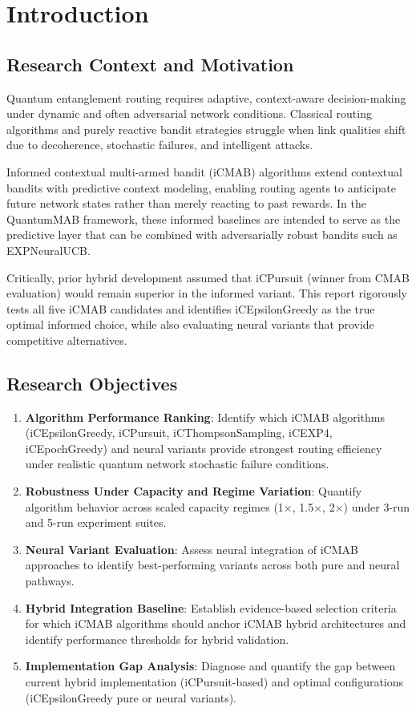 \documentclass[12pt,a4paper]{article}
\begin{document}
\newpage
\section{Introduction}

\subsection{Research Context and Motivation}
Quantum entanglement routing requires adaptive, context-aware decision-making under dynamic and often adversarial network conditions. Classical routing algorithms and purely reactive bandit strategies struggle when link qualities shift due to decoherence, stochastic failures, and intelligent attacks.

Informed contextual multi-armed bandit (iCMAB) algorithms extend contextual bandits with predictive context modeling, enabling routing agents to anticipate future network states rather than merely reacting to past rewards. In the QuantumMAB framework, these informed baselines are intended to serve as the predictive layer that can be combined with adversarially robust bandits such as EXPNeuralUCB.

Critically, prior hybrid development assumed that iCPursuit (winner from CMAB evaluation) would remain superior in the informed variant. This report rigorously tests all five iCMAB candidates and identifies iCEpsilonGreedy as the true optimal informed choice, while also evaluating neural variants that provide competitive alternatives.

\subsection{Research Objectives}
\begin{enumerate}
\item \textbf{Algorithm Performance Ranking}: Identify which iCMAB algorithms (iCEpsilonGreedy, iCPursuit, iCThompsonSampling, iCEXP4, iCEpochGreedy) and neural variants provide strongest routing efficiency under realistic quantum network stochastic failure conditions.
\item \textbf{Robustness Under Capacity and Regime Variation}: Quantify algorithm behavior across scaled capacity regimes (1$\times$, 1.5$\times$, 2$\times$) under 3-run and 5-run experiment suites.
\item \textbf{Neural Variant Evaluation}: Assess neural integration of iCMAB approaches to identify best-performing variants across both pure and neural pathways.
\item \textbf{Hybrid Integration Baseline}: Establish evidence-based selection criteria for which iCMAB algorithms should anchor iCMAB hybrid architectures and identify performance thresholds for hybrid validation.
\item \textbf{Implementation Gap Analysis}: Diagnose and quantify the gap between current hybrid implementation (iCPursuit-based) and optimal configurations (iCEpsilonGreedy pure or neural variants).
\end{enumerate}
\end{document}
